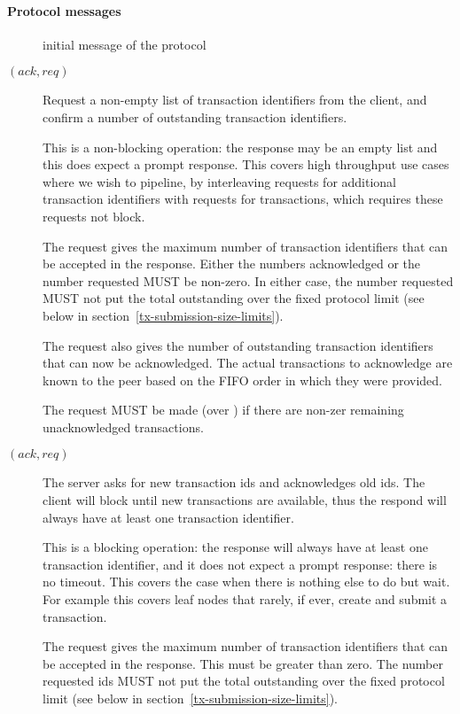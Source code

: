 \paragraph{Protocol messages}
\begin{description}
\item [\MsgInit] initial message of the protocol
\item [\MsgRequestTxIdsNB{} {\boldmath $(ack,req)$}]
      Request a non-empty list of transaction identifiers from the client,
      and confirm a number of outstanding transaction identifiers.

      This is a non-blocking operation: the response
      may be an empty list and this does expect a prompt response. This
      covers high throughput use cases where we wish to pipeline, by
      interleaving requests for additional transaction identifiers with
      requests for transactions, which requires these requests not block.

      The request gives the maximum number of transaction identifiers that
      can be accepted in the response. Either the numbers acknowledged or the
      number requested MUST be non-zero. In either case, the number requested
      MUST not put the total outstanding over the fixed protocol limit (see
      below in section~\ref{tx-submission-size-limits}).

      The request also gives the number of outstanding transaction identifiers
      that can now be acknowledged. The actual transactions to acknowledge are
      known to the peer based on the FIFO order in which they were provided.

      The request MUST be made (over \MsgRequestTxIdsB{}) if there are non-zer
      remaining unacknowledged transactions.
\item [\MsgRequestTxIdsB{} {\boldmath $(ack,req)$}]
      The server asks for new transaction ids and acknowledges old ids.
      The client will block until new transactions are available, thus the
      respond will always have at least one transaction identifier. 

      This is a blocking operation: the response will always have at least one
      transaction identifier, and it does not expect a prompt response: there
      is no timeout. This covers the case when there is nothing else to do but
      wait. For example this covers leaf nodes that rarely, if ever, create and
      submit a transaction.

      The request gives the maximum number of transaction identifiers that
      can be accepted in the response. This must be greater than zero.
      The number requested ids MUST not put the total outstanding over
      the fixed protocol limit (see below in
      section~\ref{tx-submission-size-limits}).


\end{description}
